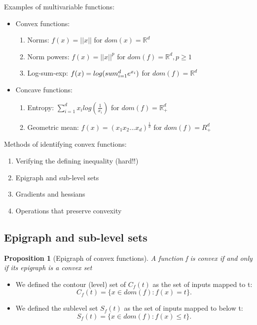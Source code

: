 \documentclass[11pt]{article}
\newtheorem{proposition}[theorem]{Proposition}
\begin{document}
Examples of multivariable functions:
\begin{itemize}
    \item Convex functions: \begin{enumerate}
        \item Norms: $f(x) = ||x||$ for $dom(x) = \mathbb{R}^d$
        \item Norm powers: $f(x) = ||x||^p$ for $dom(f) = \mathbb{R}^d, p\geq 1$     
        \item Log-sum-exp: $f(x) = log(\\sum_{i=1}^{d}e^{x_i})$ for $dom(f) = \mathbb{R}^d$  
    \end{enumerate}
    \item Concave functions: \begin{enumerate}
        \item Entropy: $\sum_{i=1}^{d} x_i log(\frac{1}{x_i})$ for $dom(f) = \mathbb{R}_+^d$  
        \item Geometric mean: $f(x) = (x_1x_2...x_d)^{\frac{1}{d}}$ for $dom(f) = R_+^d$  
    \end{enumerate}
\end{itemize}

Methods of identifying convex functions:
\begin{enumerate}
    \item Verifying the defining inequality (hard!!)
    \item Epigraph and sub-level sets
    \item Gradients and hessians
    \item Operations that preserve convexity
\end{enumerate}

\subsection*{Epigraph and sub-level sets}
\begin{proposition}[Epigraph of convex functions]
    A function f is convex if and only if its epigraph is a convex set
\end{proposition}

\begin{itemize}
    \item We defined the contour (level) set of $C_f(t)$ as the set of inputs mapped to t: \[
    C_f(t) = \{x \in dom(f): f(x) = t \}
    .\]   
    \item We defined the sublevel set $S_f(t)$ as the set of inputs mapped to below t: \[
    S_f(t) = \{ x \in dom(f) : f(x) \leq t \}
    .\]  
\end{itemize}
\end{document}
